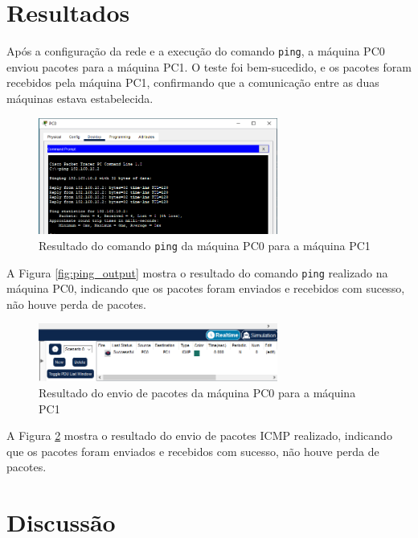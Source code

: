 \documentclass[12pt]{article}
\begin{document}
\section{Resultados}

Após a configuração da rede e a execução do comando \texttt{ping}, a máquina PC0 enviou pacotes para a máquina PC1. O teste foi bem-sucedido, e os pacotes foram recebidos pela máquina PC1, confirmando que a comunicação entre as duas máquinas estava estabelecida.

\begin{figure}[h!]
    \centering
    \includegraphics[width=0.7\textwidth]{teste_ping.png}
    \caption{Resultado do comando \texttt{ping} da máquina PC0 para a máquina PC1}
    \label{fig:teste_ping}
\end{figure}

A Figura \ref{fig:ping_output} mostra o resultado do comando \texttt{ping} realizado na máquina PC0, indicando que os pacotes foram enviados e recebidos com sucesso, não houve perda de pacotes.

\begin{figure}[h!]
    \centering
    \includegraphics[width=0.7\textwidth]{teste_ICMP.png}
    \caption{Resultado do envio de pacotes da máquina PC0 para a máquina PC1}
    \label{fig:teste_ICMP}
\end{figure}

A Figura \ref{fig:teste_ICMP} mostra o resultado do envio de pacotes ICMP realizado, indicando que os pacotes foram enviados e recebidos com sucesso, não houve perda de pacotes.

\section{Discussão}
\end{document}
